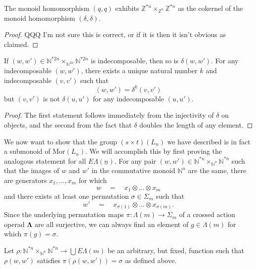 \documentclass{amsbook} %
\newcommand{\ML}{\mathbf{\Lambda}}
\newcommand{\MorLn}{\mathrm{Mor}(L_n)}
\newcommand{\EL}{E\Lambda}
\newcommand{\ELn}{E\Lambda(\underline{n})}
\numberwithin{section}{chapter}
\begin{document}
\begin{lem}\label{monoid_coeq}
The monoid homomorphism $(q,q)$ exhibits $\mathbb{Z}^{\ast n} \times_{\mathbb{Z}^n} \mathbb{Z}^{\ast n}$ as the cokernel of the monoid homomorphism $(\delta, \delta)$.
\end{lem}
\begin{proof}
QQQ I'm not sure this is correct, or if it is then it isn't obvious as claimed.
\end{proof}

\begin{lem}\label{rho_lemmas}
If $(w,w') \in \mathbb{N}^{\ast 2n} \times_{\mathbb{N}^{2n}} \mathbb{N}^{\ast 2n}$ is indecomposable, then so is $\delta(w,w')$. For any indecomposable $(w,w')$, there exists a unique natural number $k$ and indecomposable $(v,v')$ such that
\[
(w,w') = \delta^k(v,v')
\]
but $(v,v')$ is not $\delta(u,u')$ for any indecomposable $(u,u')$.
\end{lem}
\begin{proof}
The first statement follows immediately from the injectivity of $\delta$ on objects, and the second from the fact that $\delta$ doubles the length of any element.
\end{proof}


We now want to show that the group $(s \times t)(L_n)$ we have described is in fact a submonoid of $\MorLn$.  We will accomplish this  by first proving the analogous statement for all $\ELn$.  For any pair $(w, w') \in \mathbb{N}^{\ast n} \times_{\mathbb{N}^n} \mathbb{N}^{\ast n}$ such that the images of $w$ and $w'$ in the commutative monoid $\mathbb{N}^n$ are the same, there are generators $x_1, \ldots, x_m$ for which 
\[ w \quad = \quad x_1 \otimes \ldots \otimes x_m \]
and there exists at least one permutation $\sigma \in \Sigma_m$ such that
\[ w' \quad = \quad x_{\sigma(1)} \otimes \ldots \otimes x_{\sigma(m)}. \]
Since the underlying permutation maps $\pi \colon \Lambda(m) \to \Sigma_m$ of a crossed action operad $\ML$ are all surjective, we can always find an element of $g \in \Lambda(m)$ for which $\pi(g) = \sigma$. 

\begin{nota}\label{rho_ww'}
Let $\rho \colon \mathbb{N}^{\ast n} \times_{\mathbb{N}^n} \mathbb{N}^{\ast n} \to \bigcup \EL(m)$ be an arbitrary, but fixed, function such that $\rho(w,w')$ satisfies $\pi(\rho(w,w')) = \sigma$ as defined above.
\end{nota}
\end{document}
